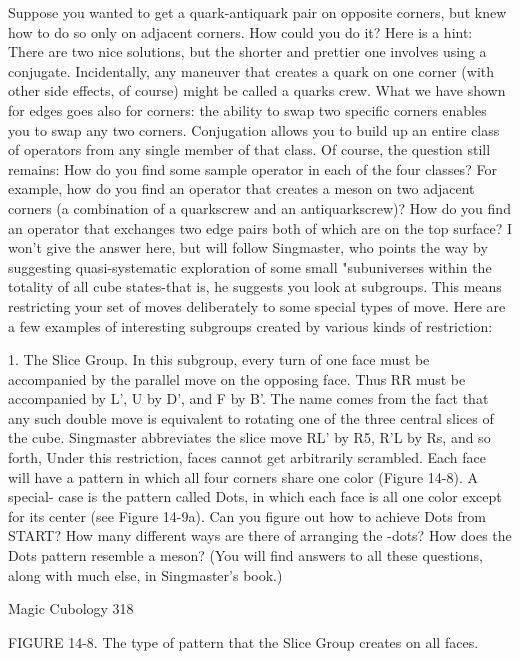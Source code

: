         Suppose you wanted to get a quark-antiquark pair on opposite corners, but
knew how to do so only on adjacent corners. How could you do it? Here is a hint:
There are two nice solutions, but the shorter and prettier one involves using a
conjugate. Incidentally, any maneuver that creates a quark on one corner (with other
side effects, of course) might be called a quarks crew.
         What we have shown for edges goes also for corners: the ability to swap two
specific corners enables you to swap any two corners. Conjugation allows you to
build up an entire class of operators from any single member of that class. Of course,
the question still remains: How do you find some sample operator in each of the four
classes? For example, how do you find an operator that creates a meson on two
adjacent corners (a combination of a quarkscrew and an antiquarkscrew)? How do
you find an operator that exchanges two edge pairs both of which are on the top
surface? I won't give the answer here, but will follow Singmaster, who points the way
by suggesting quasi-systematic exploration of some small "subuniverses within the
totality of all cube states-that is, he suggests you look at subgroups. This means
restricting your set of moves deliberately to some special types of move. Here are a
few examples of interesting subgroups created by various kinds of restriction:

          1. The Slice Group. In this subgroup, every turn of one face must be
  accompanied by the parallel move on the opposing face. Thus RR must be
  accompanied by L', U by D', and F by B'. The name comes from the fact that
  any such double move is equivalent to rotating one of the three central slices of
  the cube. Singmaster abbreviates the slice move RL' by R5, R'L by Rs, and so
  forth, Under this restriction, faces cannot get arbitrarily scrambled. Each face
  will have a pattern in which all four corners share one color (Figure 14-8). A
  special- case is the pattern called Dots, in which each face is all one color
  except for its center (see Figure 14-9a). Can you figure out how to achieve Dots
  from START? How many different ways are there of arranging the -dots? How
  does the Dots pattern resemble a meson? (You will find answers to all these
  questions, along with much else, in Singmaster's book.)




Magic Cubology                                                                    318

       FIGURE 14-8. The type of pattern that the Slice Group creates on all faces.


